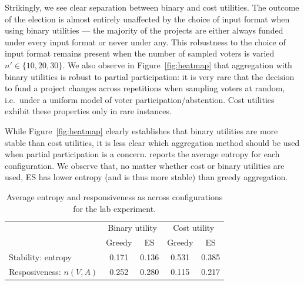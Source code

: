 \documentclass[mnsc,blindrev]{informs3_freeuse} %
\renewcommand{\rank}{\textsc{Rank}}
\newcommand{\knap}{\textsc{Knap}}
\newcommand{\mes}{ES}
\begin{document}
Strikingly, we see clear separation between binary and cost utilities. The outcome of the election is almost entirely unaffected by the choice of input format when using binary utilities --- the majority of the projects are either always funded under every input format or never under any.  
This robustness to the choice of input format remains present when the number of sampled voters is varied $n'\in\{10,20,30\}.$
%
We also observe in   Figure~\ref{fig:heatmap} that aggregation with binary utilities is robust to partial participation: it is very rare that the decision to fund a project changes across repetitions when sampling voters at random, i.e.\ under a uniform model of voter participation/abstention. 
Cost utilities exhibit these properties only in rare instances.
 
While Figure~\ref{fig:heatmap} clearly establishes that binary utilities are more stable than cost utilities, it is less clear which aggregation method should be used when partial participation is a concern.  reports the average entropy for each configuration. We observe that, no matter whether cost or binary utilities are used, \mes{} has lower entropy (and is thus more stable) than greedy aggregation.

\begin{table}[]
    \centering
    \caption{Average entropy and responsiveness as across configurations for the lab experiment. }
    \begin{tabular}{lcccc}
         \toprule
         &\multicolumn{2}{c}{Binary utility}& \multicolumn{2}{c}{Cost utility}  \\  \cmidrule(lr){2-3}\cmidrule(lr){4-5}
         & Greedy & \mes{} & Greedy & \mes{} \\
         \midrule
          Stability: entropy & 0.171 & 0.136 & 0.531 & 0.385 \\  
          Resposiveness: $n(V, A)$ & 0.252  & 0.280    & 0.115 & 0.217 \\
         \bottomrule
    \end{tabular}
    \label{tab:ent_resp}
\end{table}
\end{document}
